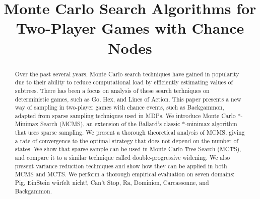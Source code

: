 \documentclass[jair,twoside,11pt,theapa]{article}
\begin{document}
\title{Monte Carlo Search Algorithms for Two-Player Games with Chance Nodes}

\author{}



\maketitle

\begin{abstract}
Over the past several years, Monte Carlo search techniques have gained in popularity 
due to their ability to reduce computational load by efficiently estimating values 
of subtrees.  
There has been a focus on analysis of these search techniques on deterministic
games, such as Go, Hex, and Lines of Action. 
This paper presents a new way of sampling in two-player games with chance events, 
such as Backgammon, adapted from sparse sampling techniques used in MDPs. 
We introduce Monte Carlo *-Minimax Search (MCMS), an extension of the Ballard's 
classic *-minimax algorithm that uses sparse sampling. 
We present a thorough theoretical analysis of MCMS, giving a rate of convergence to the
optimal strategy that does not depend on the number of states. 
We show that sparse sample can be used in Monte Carlo Tree Search (MCTS), and compare it
to a similar technique called double-progressive widening.
We also present variance reduction techniques and show how they can be applied in both 
MCMS and MCTS. 
We perform a thorough empirical evaluation on seven domains: 
Pig, EinStein w\"{u}rfelt nicht!, Can't Stop, Ra, Dominion, Carcassonne, and Backgammon.
\end{abstract}
\end{document}

